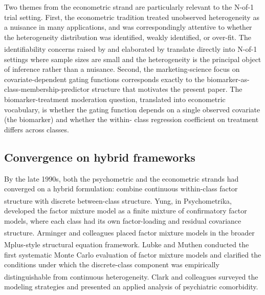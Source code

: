 \documentclass[
  11pt,
]{article}
\begin{document}
Two themes from the econometric strand are particularly relevant to the
N-of-1 trial setting. First, the econometric tradition treated
unobserved heterogeneity as a nuisance in many applications, and was
correspondingly attentive to whether the heterogeneity distribution was
identified, weakly identified, or over-fit. The identifiability
concerns raised by\textsuperscript{} and elaborated by\textsuperscript{}
translate directly into N-of-1 settings where sample sizes are small
and the heterogeneity is the principal object of inference rather than
a nuisance. Second, the marketing-science focus on covariate-dependent
gating functions corresponds exactly to the
biomarker-as-class-membership-predictor structure that motivates the
present paper. The biomarker-treatment moderation question, translated
into econometric vocabulary, is whether the gating function depends on
a single observed covariate (the biomarker) and whether the within-
class regression coefficient on treatment differs across classes.

\subsection{Convergence on hybrid frameworks}\label{convergence-on-hybrid-frameworks}

By the late 1990s, both the psychometric and the econometric strands
had converged on a hybrid formulation: combine continuous within-class
factor structure with discrete between-class structure. Yung\textsuperscript{}, in Psychometrika, developed the factor mixture model as
a finite mixture of confirmatory factor models, where each class had
its own factor-loading and residual covariance structure. Arminger and
colleagues\textsuperscript{} placed factor mixture models in the broader
Mplus-style structural equation framework. Lubke and Muthen\textsuperscript{} conducted the first systematic Monte Carlo
evaluation of factor mixture models and clarified the conditions under
which the discrete-class component was empirically distinguishable from
continuous heterogeneity. Clark and colleagues\textsuperscript{} surveyed
the modeling strategies and presented an applied analysis of
psychiatric comorbidity.
\end{document}
